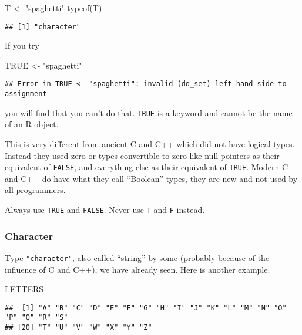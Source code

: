 \documentclass[
]{article}
\newenvironment{Shaded}{\begin{snugshade}}{\end{snugshade}}
\newcommand{\ConstantTok}[1]{\textcolor[rgb]{0.00,0.00,0.00}{#1}}
\newcommand{\FunctionTok}[1]{\textcolor[rgb]{0.00,0.00,0.00}{#1}}
\newcommand{\NormalTok}[1]{#1}
\newcommand{\OtherTok}[1]{\textcolor[rgb]{0.56,0.35,0.01}{#1}}
\newcommand{\StringTok}[1]{\textcolor[rgb]{0.31,0.60,0.02}{#1}}
\begin{document}
\begin{Shaded}
\begin{Highlighting}[]
\NormalTok{T }\OtherTok{\textless{}{-}} \StringTok{"spaghetti"}
\FunctionTok{typeof}\NormalTok{(T)}
\end{Highlighting}
\end{Shaded}

\begin{verbatim}
## [1] "character"
\end{verbatim}

If you try

\begin{Shaded}
\begin{Highlighting}[]
\ConstantTok{TRUE} \OtherTok{\textless{}{-}} \StringTok{"spaghetti"}
\end{Highlighting}
\end{Shaded}

\begin{verbatim}
## Error in TRUE <- "spaghetti": invalid (do_set) left-hand side to assignment
\end{verbatim}

you will find that you can't do that. \texttt{TRUE} is a keyword and
cannot be the name of an R object.

This is very different from ancient C and C++ which did not have logical
types. Instead they used zero or types convertible to zero like null
pointers as their equivalent of \texttt{FALSE}, and everything else as
their equivalent of \texttt{TRUE}. Modern C and C++ do have what they
call ``Boolean'' types, they are new and not used by all programmers.

Always use \texttt{TRUE} and \texttt{FALSE}. Never use \texttt{T} and
\texttt{F} instead.

\hypertarget{character}{%
\subsubsection{Character}\label{character}}

Type \texttt{"character"}, also called ``string'' by some (probably
because of the influence of C and C++), we have already seen. Here is
another example.

\begin{Shaded}
\begin{Highlighting}[]
\NormalTok{LETTERS}
\end{Highlighting}
\end{Shaded}

\begin{verbatim}
##  [1] "A" "B" "C" "D" "E" "F" "G" "H" "I" "J" "K" "L" "M" "N" "O" "P" "Q" "R" "S"
## [20] "T" "U" "V" "W" "X" "Y" "Z"
\end{verbatim}
\end{document}
